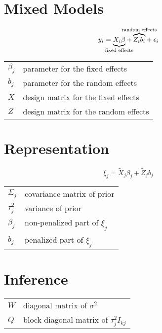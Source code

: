 \documentclass{article}
\begin{document}
\begin{multicols}{2}
\section*{Mixed Models}

$$y_i = \underbrace{X_i \beta}_{\mathclap{\text{fixed effects}}} + \overbrace{Z_i b_i}^{\mathclap{\text{random effects}}} + \: \epsilon_i$$

\begin{tabular}{l l}
$\beta_j$ & parameter for the fixed effects \\
$b_j$ & parameter for the random effects \\
$X$ &  design matrix for the fixed effects \\
$Z$ & design matrix for the random effects \\
\end{tabular}

\section*{Representation}

$$\xi_j = \tilde{X}_j \beta_j + \tilde{Z}_j b_j$$

\begin{tabular}{l l}
$\Sigma_j$ & covariance matrix of prior \\
$\tau_j^2$ & variance of prior \\
$\beta_j$ & non-penalized part of $\xi_j$ \\
$b_j$ & penalized part of $\xi_j$ \\
\end{tabular}

\section*{Inference}

\begin{tabular}{l l}
$W$ & diagonal matrix of $\sigma^2$ \\
$Q$ &  block diagonal matrix of $\tau_j^2I_{kj}$ \\ 
\end{tabular}

\end{multicols}
\end{document}
